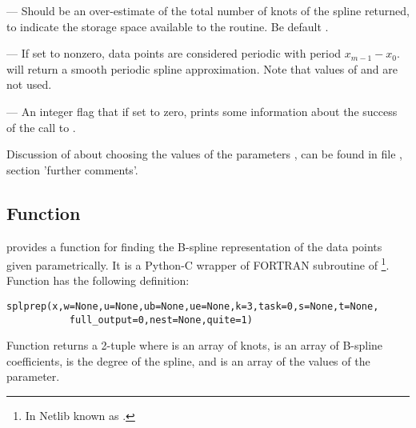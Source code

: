 \begin{description}
\begin{enumerate}
  \end{enumerate}
\item[\code{nest}] --- Should be an over-estimate of the total number
  of knots of the spline returned, to indicate the storage space
  available to the routine. Be default .
\item[\code{per}] --- If set to nonzero, data points are considered
  periodic with period $x_{m-1}-x_0$.  will return a
  smooth periodic spline approximation. Note that values of
   and  are not used.
\item[\code{quite}] --- An integer flag that if set to zero, prints
  some information about the success of the call to .
\end{description}
Discussion of about choosing the values of the parameters ,
 can be found in file , section
'further comments'.


\subsection{Function }
\label{sec:splprep}



 provides a function  for finding the
B-spline representation of the data points given parametrically. It is
a Python-C wrapper of FORTRAN subroutine  of
\footnote{In Netlib known as .}.  Function
 has the following definition:
\begin{verbatim}
splprep(x,w=None,u=None,ub=None,ue=None,k=3,task=0,s=None,t=None,
           full_output=0,nest=None,quite=1)
\end{verbatim}

Function  returns a 2-tuple  where  is
an array of knots,  is an array of B-spline coefficients, 
 is the degree of the spline, and  is an array of
the values of the parameter.

